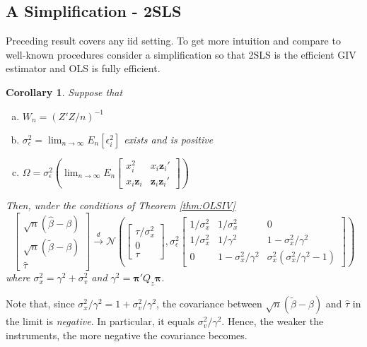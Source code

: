 \documentclass[12pt]{article}
\newtheorem{cor}{Corollary}[section]
\theoremstyle{definition}
\begin{document}
\subsection{A Simplification - 2SLS}
Preceding result covers any iid setting. To get more intuition and compare to well-known procedures consider a simplification so that 2SLS is the efficient GIV estimator and OLS is fully efficient. 

\begin{cor}
Suppose that 
  \begin{enumerate}[(a)]
    \item $W_n =(Z'Z/n)^{-1}$
    \item $\sigma_\epsilon^2 = \lim_{n \rightarrow \infty} E_n[\epsilon_i^2]$ exists and is positive
    \item $\displaystyle \Omega =\sigma_\epsilon^2 \left(\lim_{n\rightarrow \infty} E_n \left[
    \begin{array}{cc}
      x_i^2 & x_i \mathbf{z}_i' \\
       x_i \mathbf{z}_i& \mathbf{z}_i \mathbf{z}_i'
    \end{array}
    \right]\right)$
  \end{enumerate}
Then, under the conditions of Theorem \ref{thm:OLSIV}
$$
\left[
\begin{array}{c}
  \sqrt{n}\left(\widehat{\beta} - \beta\right) \\
  \sqrt{n}\left(\widetilde{\beta} - \beta\right)\\
  \widehat{\tau}
\end{array}
\right] \overset{d}{\rightarrow}
\mathcal{N}\left(
\left[
\begin{array}{c}
\tau/\sigma_x^2 \\ 
0\\
\tau
\end{array}
\right],
\sigma_\epsilon^2 \left[ \begin{array}{ccc}
  1/\sigma_x^2 & 1/\sigma_x^2 & 0\\
  1/\sigma_x^2 & 1/\gamma^2 & 1 - \sigma_x^2/\gamma^2\\
  0& 1 - \sigma_x^2/\gamma^2 & \sigma_x^2(\sigma_x^2/\gamma^2 - 1)
  \end{array}\right]
  \right)
$$
where $\sigma_x^2 = \gamma^2 + \sigma_v^2$ and $\gamma^2 = \boldsymbol{\pi}'Q_z \boldsymbol{\pi}$.
\end{cor}
Note that, since $\sigma_x^2/\gamma^2 = 1 + \sigma_v^2 /\gamma^2$, the covariance between $\sqrt{n}\left(\widetilde{\beta} - \beta\right)$ and $\widehat{\tau}$ in the limit is \emph{negative}. In particular, it equals $\sigma_v^2/\gamma^2$. Hence, the weaker the instruments, the more negative the covariance becomes.
\end{document}
